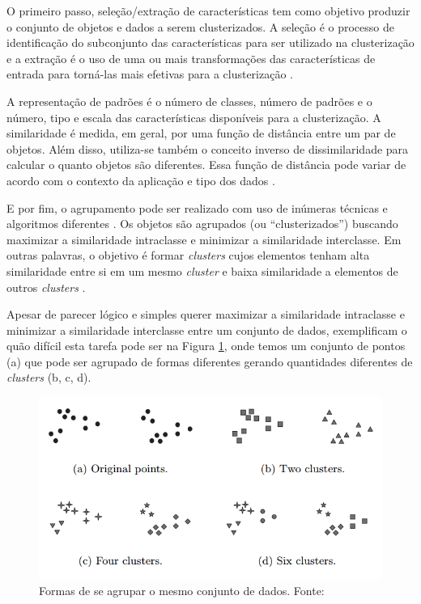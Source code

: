 O primeiro passo, seleção/extração de características tem como objetivo produzir o conjunto de objetos e dados a serem clusterizados. 
A seleção é o processo de identificação do subconjunto das características para ser utilizado na clusterização e 
a extração é o uso de uma ou mais transformações das características de entrada para 
torná-las mais efetivas para a clusterização \cite{clustering_review}.

A representação de padrões é o número de classes, número de padrões e o número, tipo e escala
das características disponíveis para a clusterização.
A similaridade é medida, em geral, por uma função de distância entre um par de objetos. Além disso, utiliza-se também
o conceito inverso de dissimilaridade para calcular o quanto objetos são diferentes. Essa função de distância pode variar de acordo 
com o contexto da aplicação e tipo dos dados \cite{clustering_review}. 

E por fim, o agrupamento pode ser realizado com uso de inúmeras técnicas e algoritmos diferentes \cite{clustering_review}.
Os objetos são agrupados (ou ``clusterizados'') buscando maximizar a similaridade intraclasse e minimizar a similaridade interclasse.
Em outras palavras, o objetivo é formar \textit{clusters} cujos elementos tenham alta similaridade entre si em um mesmo \textit{cluster} 
e baixa similaridade a elementos de outros \textit{clusters} \cite{han2011data}.

Apesar de parecer lógico e simples querer maximizar a similaridade intraclasse e minimizar a similaridade interclasse entre um conjunto de dados, 
 exemplificam o quão difícil esta tarefa pode ser na Figura \ref{fig:clusters_difficulty}, onde temos um conjunto
de pontos (a) que pode ser agrupado de formas diferentes gerando quantidades diferentes de \textit{clusters} (b, c, d).

\begin{figure}[ht!]
\centering
\includegraphics[scale=0.4]{figuras/clusters_difficulty.png}
\caption{Formas de se agrupar o mesmo conjunto de dados. Fonte: \cite{tan2013data}}
\label{fig:clusters_difficulty}
\end{figure}

